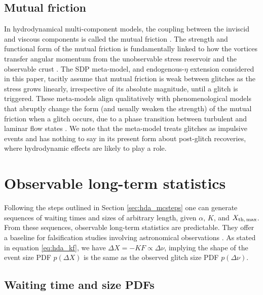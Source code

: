 \subsection{Mutual friction} \label{sec:hda_mutualfric}
In hydrodynamical multi-component models, the coupling between the inviscid and viscous components is called the mutual friction \citep{Hall1956, Barenghi1983, AnderssonSidery2006}. The strength and functional form of the mutual friction is fundamentally linked to how the vortices transfer angular momentum from the unobservable stress reservoir and the observable crust \citep{AnderssonSidery2006, Graber2018, Celora2020}. The SDP meta-model, and endogenous-$\eta$ extension considered in this paper, tacitly assume that mutual friction is weak between glitches as the stress grows linearly, irrespective of its absolute magnitude, until a glitch is triggered. These meta-models align qualitatively with phenomenological models that abruptly change the form (and usually weaken the strength) of the mutual friction when a glitch occurs, due to a phase transition between turbulent and laminar flow states \citep{Peralta2006, Mongiovi2017, Haskell2020}. We note that the meta-model treats glitches as impulsive events and has nothing to say in its present form about post-glitch recoveries, where hydrodynamic effects are likely to play a role.

\section{Observable long-term statistics} \label{sec:hda_obs}
Following the steps outlined in Section \ref{sec:hda_mcsteps} one can generate sequences of waiting times and sizes of arbitrary length, given $\alpha$, $K$, and $X_{\rm th,\,max}$. From these sequences, observable long-term statistics are predictable. They offer a baseline for falsification studies involving astronomical observations \citep{Melatos2018, Carlin2019quasi, Carlin2019ac}. As stated in equation \eqref{eq:hda_kf}, we have $\Delta X = -KF \propto \Delta \nu$, implying the shape of the event size PDF $p(\Delta X)$ is the same as the observed glitch size PDF $p(\Delta \nu)$.

\subsection{Waiting time and size PDFs}

